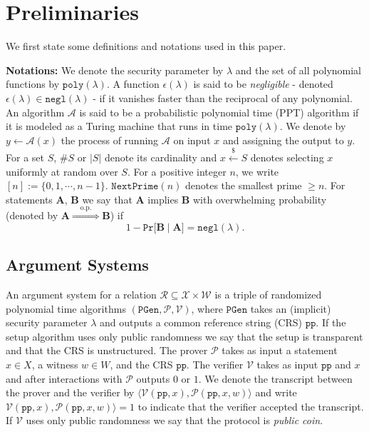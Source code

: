 \documentclass[11pt, lettersize, notitlepage, leqno, footskip=0.6cm]{article}
\newcommand{\ttt}{\texttt}
\newcommand{\negl}{\ttt{{negl}}}
\newcommand{\impop}{\overset{\;\;\;\;\mr{o.p.}\;\;\;\;}{\Longrightarrow}}
\newcommand{\mc}{\mathcal}
\newcommand{\mbf}{\mathbf}
\newcommand{\mr}{\mathrm}
\newcommand{\lam}{\lambda}
\newcommand{\sub}{\subseteq}
\newcommand{\mP}{\mc{P}}
\newcommand{\V}{\mc{V}}
\newcommand{\vs}{\vspace{-0.15cm}}
\newcommand{\noin}{\noindent}
\newcommand{\op}{overwhelming probability}
\numberwithin{equation}{section}
\begin{document}
\section{\fontsize{12}{12}\selectfont Preliminaries}

\noin We first state some definitions and notations used in this paper. \vspace{0.15cm}

\noin \textbf{Notations:} We denote the security parameter by $\lam$ and the set of all polynomial functions by $\ttt{poly}(\lam)$. A function $\epsilon(\lam)$ is said to be \textit{negligible} - denoted $\epsilon(\lam)\in \ttt{negl}(\lam)$ - if it vanishes faster than the reciprocal of any polynomial. An algorithm $\mc{A}$ is said to be a probabilistic polynomial time  (PPT) algorithm if it is modeled as a Turing machine that runs in time $\ttt{poly}(\lam)$. We denote by $y\gets \mc{A}(x)$ the process of running $\mc{A}$ on input $x$ and assigning the output to $y$. For a set $S$, $\# S$ or $|S|$ denote its cardinality and $x\xleftarrow{\$} S$ denotes selecting $x$ uniformly at random over $S$. For a positive integer $n$, we write $[n]:=\{0,1,\cdots,n-1\}$.  $\ttt{NextPrime}(n)$ denotes the smallest prime $\geq n$. For statements $\mbf{A}$, $\mbf{B}$ we say that $\mbf{A}$ implies $\mbf{B}$ with \op\;  (denoted by $\mbf{A}\impop \mbf{B}$) if \vs $$1 - \ttt{Pr}\big[\mbf{B}\;\big|\;\mbf{A}\big] = \negl(\lam).$$

\subsection{\fontsize{11}{11}\selectfont Argument Systems }


An argument system for a relation $\mc{R}\sub \mc{X} \times \mc{W}$ is a triple of randomized polynomial time algorithms $(\ttt{PGen}, \mP, \V)$, where $\ttt{PGen}$ takes an (implicit) security parameter $\lam$ and outputs a common reference string (CRS) $\ttt{pp}$. If the setup algorithm uses only public randomness we say that the setup is transparent and that the CRS is unstructured. The prover $\mP$ takes as input a statement $x \in X$, a witness $w \in W$, and the CRS $\ttt{pp}$. The verifier $\V$ takes as input $\ttt{pp}$ and $x$ and after interactions with $\mP$ outputs $0$ or $1$. We denote the transcript between the prover and the verifier by $\langle\V(\ttt{pp}, x),\mP(\ttt{pp}, x, w)\rangle$ and write $\V(\ttt{pp}, x), \mP(\ttt{pp}, x, w)\rangle = 1$ to indicate that the verifier accepted the transcript. If $\V$ uses only public randomness we say that the protocol is \textit{public coin}.
\end{document}
